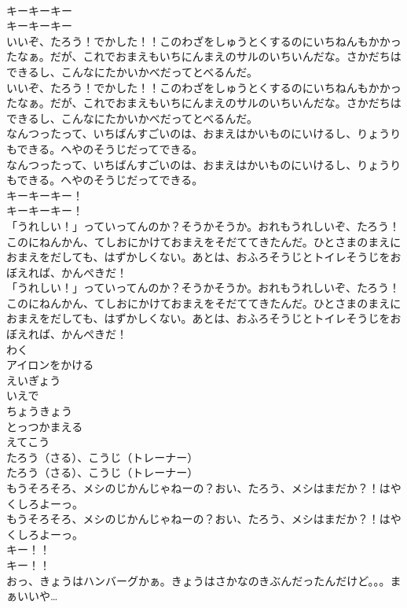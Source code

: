 \documentclass[8pt]{extreport}
\begin{document}
\begin{CJK}{UTF8}{min}
\\	キーキーキー	
\\	キーキーキー 
\\	いいぞ、たろう！でかした！！このわざをしゅうとくするのにいちねんもかかったなぁ。だが、これでおまえもいちにんまえのサルのいちいんだな。さかだちはできるし、こんなにたかいかべだってとべるんだ。	
\\	いいぞ、たろう！でかした！！このわざをしゅうとくするのにいちねんもかかったなぁ。だが、これでおまえもいちにんまえのサルのいちいんだな。さかだちはできるし、こんなにたかいかべだってとべるんだ。 
\\	なんつったって、いちばんすごいのは、おまえはかいものにいけるし、りょうりもできる。へやのそうじだってできる。	
\\	なんつったって、いちばんすごいのは、おまえはかいものにいけるし、りょうりもできる。へやのそうじだってできる。 
\\	キーキーキー！	
\\	キーキーキー！ 
\\	「うれしい！」っていってんのか？そうかそうか。おれもうれしいぞ、たろう！このにねんかん、てしおにかけておまえをそだててきたんだ。ひとさまのまえにおまえをだしても、はずかしくない。あとは、おふろそうじとトイレそうじをおぼえれば、かんぺきだ！	
\\	「うれしい！」っていってんのか？そうかそうか。おれもうれしいぞ、たろう！このにねんかん、てしおにかけておまえをそだててきたんだ。ひとさまのまえにおまえをだしても、はずかしくない。あとは、おふろそうじとトイレそうじをおぼえれば、かんぺきだ！ 
\\	わく
\\	アイロンをかける
\\	えいぎょう
\\	いえで
\\	ちょうきょう
\\	とっつかまえる
\\	えてこう
\\	たろう（さる）、こうじ（トレーナー）	
\\	たろう（さる）、こうじ（トレーナー） 
\\	もうそろそろ、メシのじかんじゃねーの？おい、たろう、メシはまだか？！はやくしろよーっ。	
\\	もうそろそろ、メシのじかんじゃねーの？おい、たろう、メシはまだか？！はやくしろよーっ。 
\\	キー！！	
\\	キー！！ 
\\	おっ、きょうはハンバーグかぁ。きょうはさかなのきぶんだったんだけど。。。まぁいいや…	

\end{CJK}
\end{document}
